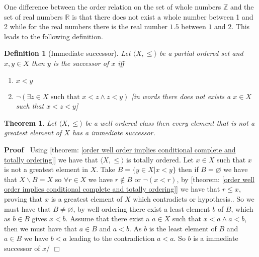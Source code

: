 \documentclass{book}
\newcommand{\nin}{\not\in}
\newcommand{\tmtextbf}[1]{\text{{\bfseries{#1}}}}
\newenvironment{proof}{\noindent\textbf{Proof\ }}{\hspace*{\fill}$\Box$\medskip}
\newtheorem{definition}{Definition}
{\theorembodyfont{\rmfamily}\newtheorem{example}{Example}}
\newtheorem{theorem}{Theorem}
\begin{document}
One difference between the order relation on the set of whole numbers
$\mathbb{Z}$ and the set of real numbers $\mathbb{R}$ is that there does not
exist a whole number between 1 and 2 while for the real numbers there is the
real number $1.5$ between $1$ and $2$. This leads to the following definition.

\begin{definition}[Immediate successor]
  \label{order immediate successor}{}Let $\langle
  X, \leqslant \rangle$ be a partial ordered set and $x, y \in X$ then $y$ is
  the \tmtextbf{immediate} successor of $x$ iff
  \begin{enumerate}
    \item $x < y$
    
    \item $\neg \left( \exists z \in X \text{ such that } x < z \wedge z < y
    \right)$ [in words there does not exists a $x \in X$ such that $x < z <
    y$]
  \end{enumerate}
\end{definition}

\begin{theorem}
  \label{order well order and immediate successor}Let $\langle X, \leqslant
  \rangle$ be a well ordered class then every element that is not a greatest
  element of $X$ has a immediate successor.
\end{theorem}

\begin{proof}
  Using [theorem: \ref{order well order implies conditional complete and
  totally ordering}] we have that $\langle X, \leqslant \rangle$ is totally
  ordered. Let $x \in X$ such that $x$ is not a greatest element in $X$. Take
  $B = \{ y \in X|x < y \}$ then if $B = \varnothing$ we have that
  $X\backslash B = X$ so $\forall r \in X$ we have $r \nin B$ or $\neg (x <
  r)$, by [theorem: \ref{order well order implies conditional complete and
  totally ordering}] we have that $r \leqslant x$, proving that $x$ is a
  greatest element of $X$ which contradicts or hypothesis.. So we must have
  that $B \neq \varnothing$, by well ordering there exist a least element $b$
  of $B$, which as $b \in B$ gives $x < b$. Assume that there exist a $a \in
  X$ such that $x < a \wedge a < b$, then we must have that $a \in B$ and $a <
  b$. As $b$ is the least element of $B$ and $a \in B$ we have $b < a$ leading
  to the contradiction $a < a$. So $b$ is a immediate successor of $x$/
\end{proof}
\end{document}
